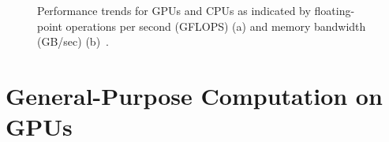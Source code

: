 \begin{figure}[t]
\centering
{}
\caption{Performance trends for GPUs and CPUs as indicated by floating-point operations per second (GFLOPS) (a) and memory bandwidth (GB/sec) (b)~\cite{NVIDIACUDA-2010}.}
\label{fig:gpu-cpu-performance}
\end{figure}

\section{General-Purpose Computation on GPUs}

